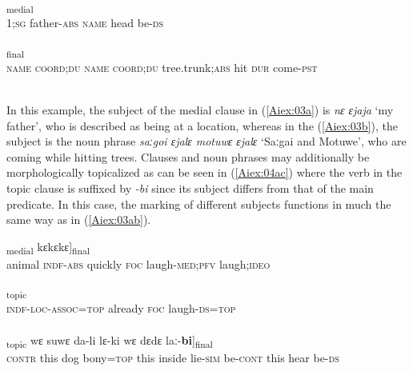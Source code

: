 \documentclass[output=paper]{LSP/langsci}
\begin{document}
\begin{exe}
\ex \label{Aiex:03ab}
\begin{xlist}
\ex \label{Aiex:03a}
\textsubscript{medial}\\
\textsc{1};\textsc{sg} father-\textsc{abs} \textsc{name} head be-\textsc{ds}\\
\glt {}\\
\ex \label{Aiex:03b}
\textsubscript{final}\\
‎\textsc{name} \textsc{coord};\textsc{du} \textsc{name} \textsc{coord};\textsc{du} tree.trunk;\textsc{abs} hit \textsc{dur} come-\textsc{pst}\\
\glt {}\\
\end{xlist}
\end{exe}

In this example, the subject of the medial clause in (\ref{Aiex:03a}) is \textit{nɛ ɛjaja} `my father', who is described as being at a location, whereas in the  (\ref{Aiex:03b}), the subject is the  noun phrase \textit{saːgoi ɛjalɛ motuwɛ ɛjalɛ} `Saːgai and Motuwe', who are coming while hitting trees. Clauses and noun phrases may additionally be morphologically topicalized as can be seen in  (\ref{Aiex:04ac}) where the verb in the topic clause is suffixed by \textit{-bi} since its subject differs from that of the main predicate. In this case, the marking of different subjects functions in much the same way as in (\ref{Aiex:03ab}).

\begin{exe}
\ex \label{Aiex:04ac}
\begin{xlist}
\ex \label{Aiex:04a}
\gll [[na	no-wa ɛimɛ ka aɡlɛ-si]\textsubscript{medial} kɛkɛkɛ]\textsubscript{final}\\
animal	\textsc{indf}-\textsc{abs} quickly \textsc{foc} laugh-\textsc{med};\textsc{pfv} laugh;\textsc{ideo}\\
‎‎‎\glt {}\\
\ex \label{Aiex:04b}
\gll [no-wɛ-mi=jaː	ɛimɛ	ka	aɡlɛ-\textbf{bi}=jaː]\textsubscript{topic}\\
‎\textsc{indf}-‎\textsc{loc}-‎\textsc{assoc}=‎\textsc{top} already ‎\textsc{foc} laugh-‎\textsc{ds}=‎\textsc{top}\\
‎‎‎\glt {}\\
\ex \label{Aiex:04c}
\gll [[no	wɛ	aːɡɛ	kɛɡa=jaː]\textsubscript{topic}	wɛ	suwɛ	da-li	lɛ-ki	wɛ	dɛdɛ	laː-\textbf{bi}]\textsubscript{final}\\
\textsc{contr} this dog bony=‎\textsc{top} this inside lie-‎\textsc{sim} be-‎\textsc{cont} this hear be-‎\textsc{ds}\\
\glt {}\\
\end{xlist}
\end{exe}
\end{document}
